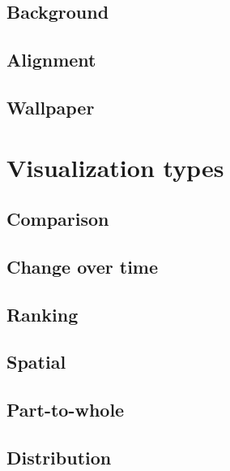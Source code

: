 \documentclass[
]{book}
\begin{document}
\hypertarget{background}{%
\section{Background}\label{background}}

\hypertarget{alignment}{%
\section{Alignment}\label{alignment}}

\hypertarget{wallpaper}{%
\section{Wallpaper}\label{wallpaper}}

\hypertarget{visualization-types}{%
\chapter{Visualization types}\label{visualization-types}}

\hypertarget{comparison}{%
\section{Comparison}\label{comparison}}

\hypertarget{change-over-time}{%
\section{Change over time}\label{change-over-time}}

\hypertarget{ranking}{%
\section{Ranking}\label{ranking}}

\hypertarget{spatial}{%
\section{Spatial}\label{spatial}}

\hypertarget{part-to-whole}{%
\section{Part-to-whole}\label{part-to-whole}}

\hypertarget{distribution}{%
\section{Distribution}\label{distribution}}
\end{document}
